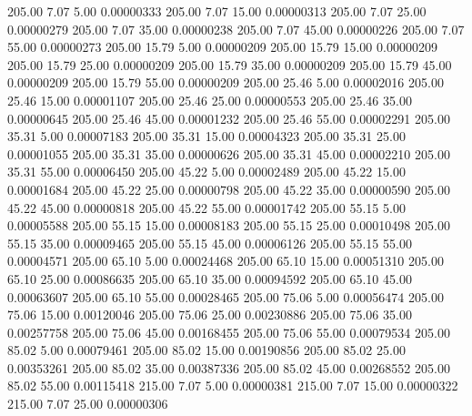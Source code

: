     205.00      7.07      5.00     0.00000333
    205.00      7.07     15.00     0.00000313
    205.00      7.07     25.00     0.00000279
    205.00      7.07     35.00     0.00000238
    205.00      7.07     45.00     0.00000226
    205.00      7.07     55.00     0.00000273
    205.00     15.79      5.00     0.00000209
    205.00     15.79     15.00     0.00000209
    205.00     15.79     25.00     0.00000209
    205.00     15.79     35.00     0.00000209
    205.00     15.79     45.00     0.00000209
    205.00     15.79     55.00     0.00000209
    205.00     25.46      5.00     0.00002016
    205.00     25.46     15.00     0.00001107
    205.00     25.46     25.00     0.00000553
    205.00     25.46     35.00     0.00000645
    205.00     25.46     45.00     0.00001232
    205.00     25.46     55.00     0.00002291
    205.00     35.31      5.00     0.00007183
    205.00     35.31     15.00     0.00004323
    205.00     35.31     25.00     0.00001055
    205.00     35.31     35.00     0.00000626
    205.00     35.31     45.00     0.00002210
    205.00     35.31     55.00     0.00006450
    205.00     45.22      5.00     0.00002489
    205.00     45.22     15.00     0.00001684
    205.00     45.22     25.00     0.00000798
    205.00     45.22     35.00     0.00000590
    205.00     45.22     45.00     0.00000818
    205.00     45.22     55.00     0.00001742
    205.00     55.15      5.00     0.00005588
    205.00     55.15     15.00     0.00008183
    205.00     55.15     25.00     0.00010498
    205.00     55.15     35.00     0.00009465
    205.00     55.15     45.00     0.00006126
    205.00     55.15     55.00     0.00004571
    205.00     65.10      5.00     0.00024468
    205.00     65.10     15.00     0.00051310
    205.00     65.10     25.00     0.00086635
    205.00     65.10     35.00     0.00094592
    205.00     65.10     45.00     0.00063607
    205.00     65.10     55.00     0.00028465
    205.00     75.06      5.00     0.00056474
    205.00     75.06     15.00     0.00120046
    205.00     75.06     25.00     0.00230886
    205.00     75.06     35.00     0.00257758
    205.00     75.06     45.00     0.00168455
    205.00     75.06     55.00     0.00079534
    205.00     85.02      5.00     0.00079461
    205.00     85.02     15.00     0.00190856
    205.00     85.02     25.00     0.00353261
    205.00     85.02     35.00     0.00387336
    205.00     85.02     45.00     0.00268552
    205.00     85.02     55.00     0.00115418
    215.00      7.07      5.00     0.00000381
    215.00      7.07     15.00     0.00000322
    215.00      7.07     25.00     0.00000306
